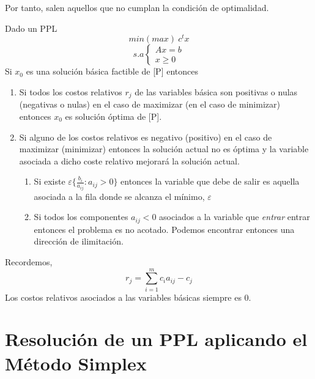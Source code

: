 \documentclass[11pt,fleqn]{book} %
\begin{document}
Por tanto, salen aquellos que no cumplan la condición de optimalidad.
\newpage
\begin{theorem}
  Dado un PPL 
  $$min (max) ~ c^t x $$
  $$s.a \left\{ \begin{array}{c}
	Ax=b \\
	x\geq 0
  \end{array}\right.$$
  Si $x_0$ es una solución básica factible de [P] entonces
  \begin{enumerate}
  \item Si todos los costos relativos $r_j$ de las variables básica son positivas o nulas (negativas o nulas) en el caso de maximizar (en el caso de minimizar) entonces $x_0$ es solución óptima de [P].
  \item Si alguno de los costos relativos es negativo (positivo) en el caso de maximizar (minimizar) entonces la solución actual no es óptima y la variable asociada a dicho coste relativo mejorará la solución actual.
	\begin{enumerate}
	\item Si existe $\varepsilon\{\frac{b_i}{a_{ij}} : a_{ij} >0 \}$ entonces la variable que debe de salir es aquella asociada a la fila donde se alcanza el mínimo, $\varepsilon$
	\item Si todos los componentes $a_{ij}<0$ asociados a la variable que \textit{entrar} entrar entonces el problema es no acotado. Podemos encontrar entonces una dirección de ilimitación.
	\end{enumerate}
  \end{enumerate}
  Recordemos, $$r_j=\sum_{i=1}^{m}c_i a_{ij}-c_j$$ 
  Los costos relativos asociados a las variables básicas siempre es $0$.
\end{theorem}

\section{Resolución de un PPL aplicando el Método Simplex}
\end{document}
